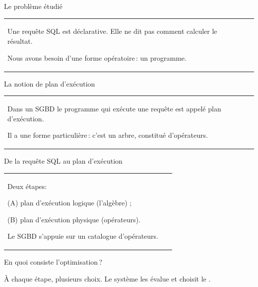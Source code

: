 
\begin{frame}{Le problème étudié}



\vfill

\begin{tabular}{p{9cm}p{5cm}}
Une requête SQL est \alert{déclarative}. Elle ne dit pas \alert{comment} calculer le résultat.

\medskip

Nous avons besoin d'une \alert{forme opératoire}\,: un programme.
&
~
\end{tabular}

    
\end{frame}


\begin{frame}{La notion de plan d'exécution}

\vfill
\begin{tabular}{p{9cm}p{5cm}}
Dans un SGBD le programme qui exécute une requête est appelé \alert{plan d'exécution}.

\medskip
Il a une forme particulière\,: c'est un \alert{arbre}, constitué \alert{d'opérateurs}.
&
~
\end{tabular}
\end{frame}


\begin{frame}{De la requête SQL au plan d'exécution}

\vfill

\begin{tabular}{p{9cm}p{5cm}}
Deux étapes: 
\begin{redlist}
 \item (A) plan d'exécution \alert{logique} (l'algèbre) ;
  \item (B) plan d'exécution \alert{physique} (opérateurs).
\end{redlist}
\medskip
Le SGBD s'appuie  sur un \alert{catalogue} d'opérateurs.
&
~
\end{tabular}
\end{frame}

\begin{frame}{En quoi consiste l'optimisation\,?}


\vfill
{}
\vfill

\alert{À chaque étape, plusieurs choix}. Le système les évalue et choisit le .

\end{frame}

